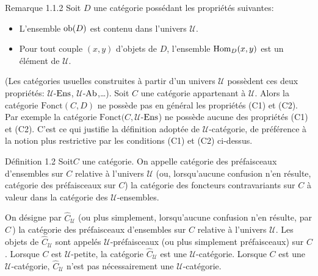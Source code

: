 \documentclass[10pt]{../fichiers-configuration-latex/smfart}
\begin{document}
\begin{enonce*}[remark]{Remarque 1.1.2}
Soit $D$ une catégorie possédant les propriétés suivantes:
\begin{itemize}
\item[(C1)] L'ensemble $\operatorname{ob}(D)$ est contenu dans l'univers $𝒰$.

\item[(C2)] Pour tout couple $(x,y)$ d'objets de $D$, l'ensemble
  $\operatorname{Hom}_D(x,y)$ est un élément de $𝒰$.
\end{itemize}
(Les catégories usuelles construites à partir d'un univers
$𝒰$ possèdent ces deux propriétés: $𝒰$-$\operatorname{Ens}$,
$𝒰$-$\operatorname{Ab}$,\ldots). Soit $C$ une catégorie appartenant à
$𝒰$. Alors la catégorie $\text{Fonct}(C,D)$ ne possède pas
en général les propriétés (C1) et (C2). Par exemple la catégorie
$\text{Fonct}(C,𝒰$-$\operatorname{Ens}$) ne possède aucune des propriétés
(C1) et (C2). C'est ce qui justifie la définition adoptée de
$𝒰$-catégorie, de préférence à la notion plus restrictive
par les conditions (C1) et (C2) ci-dessus.
\end{enonce*}

\begin{enonce*}{Définition 1.2}
Soit\pageoriginale $C$ une catégorie. On appelle catégorie des %
préfaisceaux d'ensembles sur $C$ relative à l'univers $𝒰$
(ou, lorsqu'aucune confusion n'en résulte, catégorie des
préfaisceaux sur $C$) la catégorie des foncteurs contravariants sur
$C$ à valeur dans la catégorie des $𝒰$-ensembles.
\end{enonce*}

On désigne par $\widehat{C}_{𝒰}$ (ou plus
simplement, lorsqu'aucune confusion n'en résulte, par
$\widehat{C}$\,) la catégorie des préfaisceaux
d'ensembles sur $C$ relative à l'univers $𝒰$. Les objets de
$\widehat{C}_{𝒰}$ sont appelés
$𝒰$-préfaisceaux (ou plus simplement préfaisceaux) sur $C$.
Lorsque $C$ est $𝒰$-petite, la catégorie
$\widehat{C}_{𝒰}$ est une
$𝒰$-catégorie. Lorsque $C$ est une $𝒰$-catégorie,
$\widehat{C}_{𝒰}$ n'est pas nécessairement une
$𝒰$-catégorie.
\end{document}
